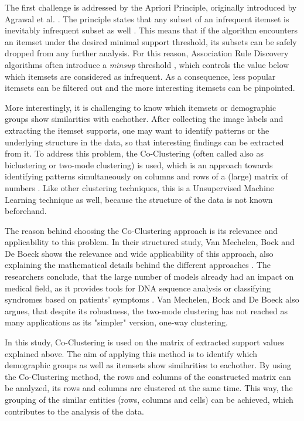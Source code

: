 The first challenge is addressed by the Apriori Principle, originally introduced by Agrawal et al. \cite{mining_sequential_patterns_agrawal}. The principle states that any subset of an infrequent itemset is inevitably infrequent subset as well \cite{mining_sequential_patterns_agrawal, introtodatamining}. This means that if the algorithm encounters an itemset under the desired minimal support threshold, its subsets can be safely dropped from any further analysis. For this reason, Association Rule Discovery algorithms often introduce a \emph{minsup} threshold \cite{database_mining_agrawal, mining_association_rules_agrawal, introtodatamining}, which controls the value below which itemsets are considered as infrequent. As a consequence, less popular itemsets can be filtered out and the more interesting itemsets can be pinpointed. 

More interestingly, it is challenging to know which itemsets or demographic groups show similarities with eachother. After collecting the image labels and extracting the itemset supports, one may want to identify patterns or the underlying structure in the data, so that interesting findings can be extracted from it. To address this problem, the Co-Clustering (often called also as biclustering or two-mode clustering) is used, which is an approach towards identifying patterns simultaneously on columns and rows of a (large) matrix of numbers \cite{coclustering}. Like other clustering techniques, this is a Unsupervised Machine Learning technique as well, because the structure of the data is not known beforehand. 

The reason behind choosing the Co-Clustering approach is its relevance and applicability to this problem. In their structured study, Van Mechelen, Bock and De Boeck shows the relevance and wide applicability of this approach, also explaining the mathematical details behind the different approaches \cite{coclustering}. The researchers conclude, that the large number of models already had an impact on medical field, as it provides tools for DNA sequence analysis or classifying syndromes based on patients' symptoms \cite{coclustering}. Van Mechelen, Bock and De Boeck also argues, that despite its robustness, the two-mode clustering has not reached as many applications as its "simpler" version, one-way clustering. 

In this study, Co-Clustering is used on the matrix of extracted support values explained above. The aim of applying this method is to identify which demographic groups as well as itemsets show similarities to eachother. By using the Co-Clustering method, the rows and columns of the constructed matrix can be analyzed, its rows and columns are clustered at the same time. This way, the grouping of the similar entities (rows, columns and cells) can be achieved, which contributes to the analysis of the data.


